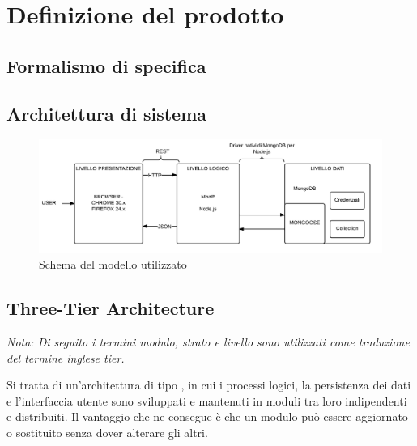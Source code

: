 \section{Definizione del prodotto}


\subsection{Formalismo di specifica}

\subsection{Architettura di sistema}

\begin{figure}[H]
\centering
\includegraphics[scale=0.2]{3-TIER.png}
\caption{Schema del modello utilizzato \label{fig:architetturadisistema}}
\end{figure}

\subsection{Three-Tier Architecture}

\emph{Nota: Di seguito i termini modulo, strato e livello sono utilizzati come traduzione del termine inglese tier.}
 
Si tratta di un'architettura di tipo , in cui i processi logici, la persistenza dei dati e l'interfaccia utente sono sviluppati e mantenuti in moduli tra loro indipendenti e distribuiti. Il vantaggio che ne consegue è che un modulo può essere aggiornato o sostituito senza dover alterare gli altri.

